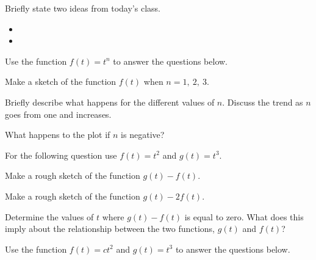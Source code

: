 \postClass

\begin{problem}
\item Briefly state two ideas from today's class.
  \begin{itemize}
  \item
  \item
  \end{itemize}

\item Use the function $f(t)=t^n$ to answer the questions below.

  \scalebox{0.7}{}

  \begin{subproblem}
  \item Make a sketch of the function $f(t)$ when $n=1,~2,~3$.
  \item Briefly describe what happens for the different values of
    $n$. Discuss the trend as $n$ goes from one and increases.
    \vfill
  \item What happens to the plot if $n$ is negative?
    \vfill
  \end{subproblem}

\clearpage

\item For the following question use $f(t)=t^2$ and $g(t)=t^3$.
  \begin{subproblem}
  \item Make a rough sketch of the function $g(t)-f(t)$.  

    \vfill

  \item Make a rough sketch of the function $g(t)-2f(t)$.  

    \vfill

  \item Determine the values of $t$ where $g(t)-f(t)$ is equal to
    zero. What does this imply about the relationship between the two
    functions, $g(t)$ and $f(t)$?

    \vspace{3em}

  \end{subproblem}

  \clearpage


\item Use the function $f(t)=c t^2$ and $g(t)=t^3$ to answer the
  questions below.


\end{problem}

